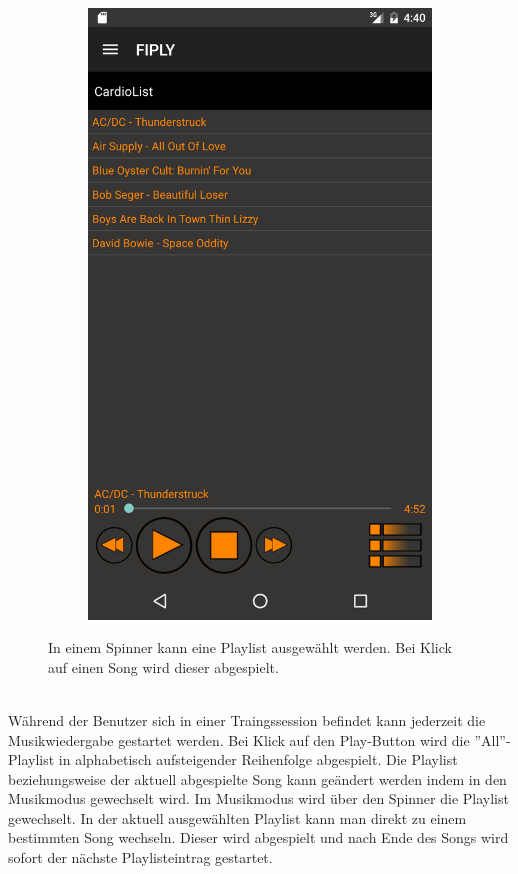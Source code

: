 \documentclass[FIPLY_base.tex]{subfiles}
\begin{document}
\begin{figure}[h]
\begin{subfigure}[b]{0.3\textwidth}
	\includegraphics[scale=0.17]{img/musicListenView2}
	\end{subfigure}
	\caption{In einem Spinner kann eine Playlist ausgewählt werden. Bei Klick auf einen Song wird dieser abgespielt.}
\end{figure}

\ \\
Während der Benutzer sich in einer Traingssession befindet kann jederzeit die Musikwiedergabe gestartet werden.
Bei Klick auf den Play-Button wird die ''All''-Playlist in alphabetisch aufsteigender Reihenfolge abgespielt. \newline
Die Playlist beziehungsweise der aktuell abgespielte Song kann geändert werden indem in den Musikmodus gewechselt wird. \newline
Im Musikmodus wird über den Spinner die Playlist gewechselt. \newline
In der aktuell ausgewählten Playlist kann man direkt zu einem bestimmten Song wechseln. 
Dieser wird abgespielt und nach Ende des Songs wird sofort der nächste Playlisteintrag gestartet.
\end{document}
